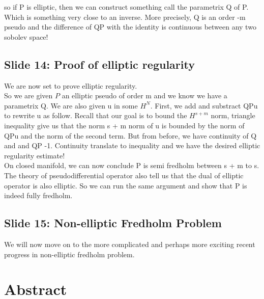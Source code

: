 \documentclass{article}
\begin{document}
so if P is elliptic, then we can construct something call the parametrix Q of P. Which is something very close to an inverse. More precisely, Q is an order -m pseudo and the difference of QP with the identity is continuous between any two sobolev space! 


\subsection{Slide 14: Proof of elliptic regularity}
We are now set to prove elliptic regularity. \\

So we are given $P$ an elliptic pseudo of order m and we know we have a parametrix Q. We are also given u in some $H^N$. First, we add and substract QPu to rewrite u as follow. Recall that our goal is to bound the $H^{s + m}$ norm, triangle inequality give us that the norm s + m norm of u is bounded by the norm of QPu and the norm of the second term. But from before, we have continuity of Q and and QP -1. Continuity translate to inequality and we have the desired elliptic regularity estimate! \\

On closed manifold, we can now conclude P is semi fredholm between s + m to s. 
The theory of pseudodifferential operator also tell us that the dual of elliptic operator is also elliptic. So we can run the same argument and show that P is indeed fully fredholm. 

\subsection{Slide 15: Non-elliptic Fredholm Problem}
We will now move on to the more complicated and perhaps more exciting recent progress in non-elliptic fredholm problem. 






\appendix
\section*{Abstract}
\end{document}
